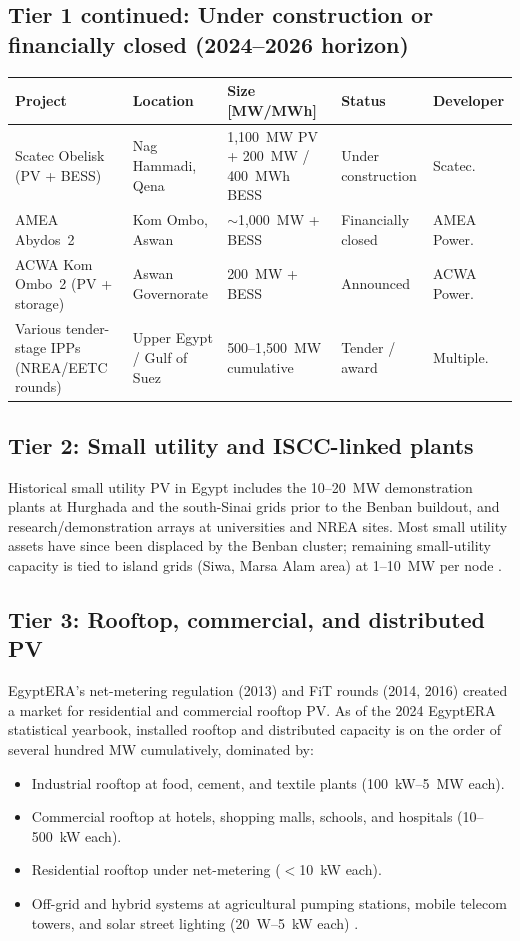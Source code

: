 \documentclass[11pt,a4paper]{article}
\begin{document}
\subsection{Tier 1 continued: Under construction or financially closed (2024--2026 horizon)}
\begin{longtable}{@{}p{4.6cm}p{3.0cm}p{2.2cm}p{1.6cm}p{3.2cm}@{}}
\toprule
\textbf{Project} & \textbf{Location} & \textbf{Size [MW/MWh]} & \textbf{Status} & \textbf{Developer} \\
\midrule
\endhead
Scatec Obelisk (PV + BESS) & Nag Hammadi, Qena & 1{,}100~MW PV + 200~MW / 400~MWh BESS \cite{ieeeref_scatec_obelisk} & Under construction & Scatec. \\
AMEA Abydos~2 & Kom Ombo, Aswan & $\sim$1{,}000~MW + BESS \cite{ieeeref_amea_abydos2} & Financially closed & AMEA Power. \\
ACWA Kom Ombo~2 (PV + storage) & Aswan Governorate & 200~MW + BESS \cite{ieeeref_acwa_kom_ombo} & Announced & ACWA Power. \\
Various tender-stage IPPs (NREA/EETC rounds) & Upper Egypt / Gulf of Suez & 500--1{,}500~MW cumulative \cite{ieeeref_irena_egypt} & Tender / award & Multiple. \\
\bottomrule
\end{longtable}

\subsection{Tier 2: Small utility and ISCC-linked plants}
Historical small utility PV in Egypt includes the 10--20~MW demonstration plants at Hurghada and the south-Sinai grids prior to the Benban buildout, and research/demonstration arrays at universities and NREA sites. Most small utility assets have since been displaced by the Benban cluster; remaining small-utility capacity is tied to island grids (Siwa, Marsa Alam area) at 1--10~MW per node \cite{ieeeref_nrea}.

\subsection{Tier 3: Rooftop, commercial, and distributed PV}
EgyptERA's net-metering regulation (2013) and FiT rounds (2014, 2016) created a market for residential and commercial rooftop PV. As of the 2024 EgyptERA statistical yearbook, installed rooftop and distributed capacity is on the order of several hundred MW cumulatively, dominated by:
\begin{itemize}[nosep]
\item Industrial rooftop at food, cement, and textile plants (100~kW--5~MW each).
\item Commercial rooftop at hotels, shopping malls, schools, and hospitals (10--500~kW each).
\item Residential rooftop under net-metering ($<$10~kW each).
\item Off-grid and hybrid systems at agricultural pumping stations, mobile telecom towers, and solar street lighting (20~W--5~kW each) \cite{ieeeref_egyptera, ieeeref_irena_egypt}.
\end{itemize}
\end{document}
